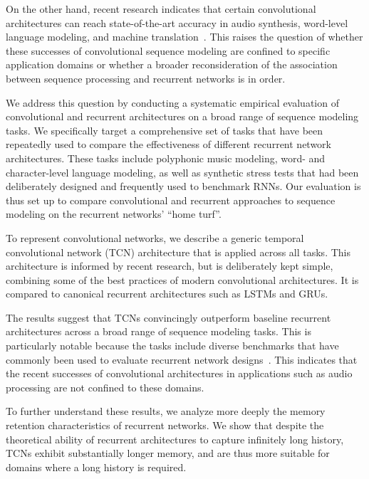 \documentclass{article}
\begin{document}
On the other hand, recent research indicates that certain convolutional architectures can reach state-of-the-art accuracy in audio synthesis, word-level language modeling, and machine translation~\cite{waveNet,kalchbrenner2016neural,dauphinGatedConv,Gehring2017:ACL,gehring2017convolutional}. This raises the question of whether these successes of convolutional sequence modeling are confined to specific application domains or whether a broader reconsideration of the association between sequence processing and recurrent networks is in order.

We address this question by conducting a systematic empirical evaluation of convolutional and recurrent architectures on a broad range of sequence modeling tasks. We specifically target a comprehensive set of tasks that have been repeatedly used to compare the effectiveness of different recurrent network architectures. These tasks include polyphonic music modeling, word- and character-level language modeling, as well as synthetic stress tests that had been deliberately designed and frequently used to benchmark RNNs. Our evaluation is thus set up to compare convolutional and recurrent approaches to sequence modeling on the recurrent networks' ``home turf''.

To represent convolutional networks, we describe a generic temporal convolutional network (TCN) architecture that is applied across all tasks. This architecture is informed by recent research, but is deliberately kept simple, combining some of the best practices of modern convolutional architectures. It is compared to canonical recurrent architectures such as LSTMs and GRUs.

The results suggest that TCNs convincingly outperform baseline recurrent architectures across a broad range of sequence modeling tasks. This is particularly notable because the tasks include diverse benchmarks that have commonly been used to evaluate recurrent network designs~\cite{chung2014empirical,Pascanu2014:ICLR,jozefowicz2015empirical,Zhang2016NIPS}. This indicates that the recent successes of convolutional architectures in applications such as audio processing are not confined to these domains.


To further understand these results, we analyze more deeply the memory retention characteristics of recurrent networks. We show that despite the theoretical ability of recurrent architectures to capture infinitely long history, TCNs exhibit substantially longer memory, and are thus more suitable for domains where a long history is required.
\end{document}
